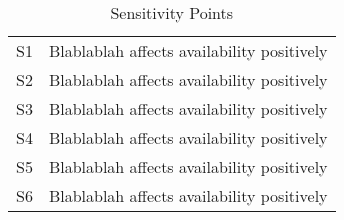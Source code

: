 \begin{table}[H]
	\begin{center}
		\begin{tabular}{| c | p{10cm} | }
    		\hline
			S1		&	Blablablah affects availability positively 			\\
			S2		& 	Blablablah affects availability positively 			\\	
			S3		&	Blablablah affects availability positively  		\\
			S4		& 	Blablablah affects availability positively  		\\															
			S5		&	Blablablah affects availability positively 			\\
			S6		& 	Blablablah affects availability positively 			\\																													
			\hline
    	\end{tabular}
	\end{center}
	\label{tab:sensetivityPoints}
	\caption{Sensitivity Points}
\end{table}
